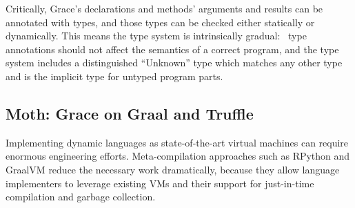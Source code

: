 Critically, Grace's declarations and methods' arguments
and results can be annotated with types, and those types can be  checked
either statically or dynamically. This means the type system is
intrinsically gradual:%
%
~type annotations should not affect the semantics of a correct
program\citep{XXXSiek2015}, and the type system
includes a distinguished ``Unknown'' type which matches any other type
and is the implicit type for untyped program parts.





\subsection{Moth: Grace on Graal and Truffle}
\label{ssec:moth}

Implementing dynamic languages as state-of-the-art virtual machines
can require enormous engineering efforts.
Meta-compilation approaches\citep{Marr:2015:MTPE}
such as RPython\citep{Bolz:2009:TMP,Bolz:2013:IMT}
and GraalVM\citep{Wurthinger2013,Wurthinger:2017:PPE}
reduce the necessary work dramatically,
because they allow language implementers to leverage existing VMs
and their support for just-in-time compilation and garbage collection.

